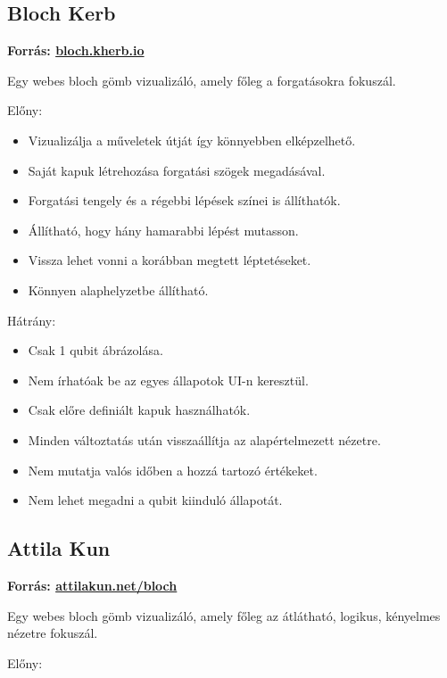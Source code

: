 \documentclass[fontsize=12pt,a4paper]{article}
\begin{document}
\vspace{0.4cm}
\subsection{Bloch Kerb}
\textbf{Forrás: \href{https://bloch.kherb.io/}{bloch.kherb.io}}

Egy webes bloch gömb vizualizáló, amely főleg a forgatásokra fokuszál.

Előny:

\begin{itemize}
    \item Vizualizálja a műveletek útját így könnyebben elképzelhető.
    \item Saját kapuk létrehozása forgatási szögek megadásával.
    \item Forgatási tengely és a régebbi lépések színei is állíthatók.
    \item Állítható, hogy hány hamarabbi lépést mutasson.
    \item Vissza lehet vonni a korábban megtett léptetéseket.
    \item Könnyen alaphelyzetbe állítható.
\end{itemize}

Hátrány:

\begin{itemize}
    \item Csak 1 qubit ábrázolása.
    \item Nem írhatóak be az egyes állapotok UI-n keresztül.
    \item Csak előre definiált kapuk használhatók.
    \item Minden változtatás után visszaállítja az alapértelmezett nézetre.
    \item Nem mutatja valós időben a hozzá tartozó értékeket.
    \item Nem lehet megadni a qubit kiinduló állapotát.
\end{itemize}


\vspace{0.4cm}
\subsection{Attila Kun}
\textbf{Forrás: \href{https://attilakun.net/bloch/}{attilakun.net/bloch}}

Egy webes bloch gömb vizualizáló, amely főleg az átlátható, logikus, kényelmes nézetre fokuszál.

Előny:
\end{document}
